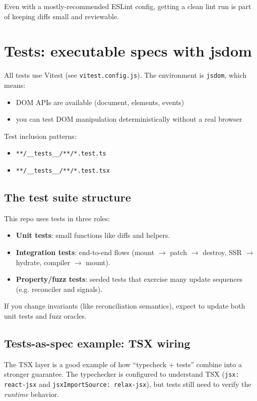 Even with a mostly-recommended ESLint config, getting a clean lint run is part of keeping diffs small and reviewable.

\section{Tests: executable specs with jsdom}

All tests use Vitest (see \texttt{vitest.config.js}).
The environment is \texttt{jsdom}, which means:

\begin{itemize}
\item DOM APIs are available (document, elements, events)
\item you can test DOM manipulation deterministically without a real browser
\end{itemize}

Test inclusion patterns:

\begin{itemize}
\item \texttt{**/\_\_tests\_\_/**/*.test.ts}
\item \texttt{**/\_\_tests\_\_/**/*.test.tsx}
\end{itemize}

\subsection{The test suite structure}

This repo uses tests in three roles:

\begin{itemize}
\item \textbf{Unit tests}: small functions like diffs and helpers.
\item \textbf{Integration tests}: end-to-end flows (mount $\to$ patch $\to$ destroy, SSR $\to$ hydrate, compiler $\to$ mount).
\item \textbf{Property/fuzz tests}: seeded tests that exercise many update sequences (e.g. reconciler and signals).
\end{itemize}

If you change invariants (like reconciliation semantics), expect to update both unit tests and fuzz oracles.

\subsection{Tests-as-spec example: TSX wiring}

The TSX layer is a good example of how ``typecheck + tests'' combine into a stronger guarantee.
The typechecker is configured to understand TSX (\texttt{jsx: react-jsx} and \texttt{jsxImportSource: relax-jsx}), but tests still need to verify the \emph{runtime} behavior.


